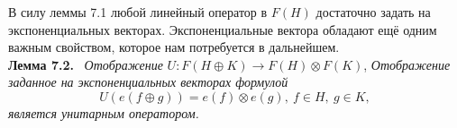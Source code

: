 \documentclass[a5paper, 16pt]{book}
\begin{document}
В силу леммы 7.1 любой линейный оператор в $F(H)$ достаточно задать на экспоненциальных векторах. Экспоненциальные вектора обладают ещё одним важным свойством, которое нам потребуется в дальнейшем.\\

\noindent\textbf{Лемма 7.2.} \ \textit{Отображение} $U: F(H \oplus K) \rightarrow F(H) \otimes F(K)$, \textit{Отображение заданное на экспоненциальных векторах формулой}
$$
U(e(f \oplus g))=e(f) \otimes e(g), \ f \in H, \ g \in K,
$$
\textit{является унитарным оператором.}
\end{document}

